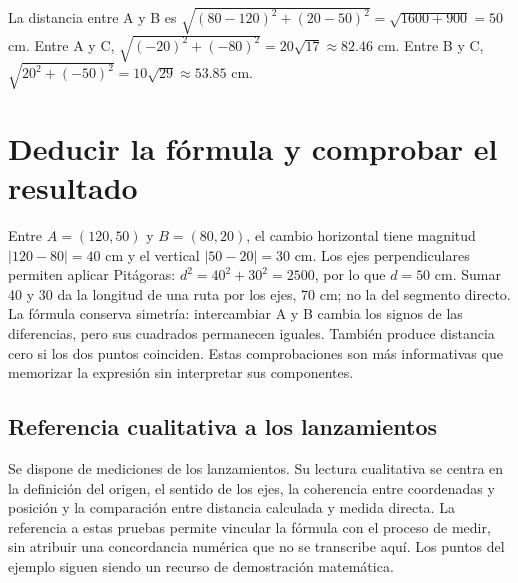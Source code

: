 \documentclass[spanish,letterpaper,oneside]{article}
\begin{document}
La distancia entre A y B es $\sqrt{(80-120)^2+(20-50)^2}=\sqrt{1600+900}=50$ cm. Entre A y C, $\sqrt{(-20)^2+(-80)^2}=20\sqrt{17}\approx82.46$ cm. Entre B y C, $\sqrt{20^2+(-50)^2}=10\sqrt{29}\approx53.85$ cm.
\begin{center}\end{center}
\section{Deducir la fórmula y comprobar el resultado}
Entre $A=(120,50)$ y $B=(80,20)$, el cambio horizontal tiene magnitud $|120-80|=40$ cm y el vertical $|50-20|=30$ cm. Los ejes perpendiculares permiten aplicar Pitágoras: $d^2=40^2+30^2=2500$, por lo que $d=50$ cm. Sumar 40 y 30 da la longitud de una ruta por los ejes, 70 cm; no la del segmento directo.
La fórmula conserva simetría: intercambiar A y B cambia los signos de las diferencias, pero sus cuadrados permanecen iguales. También produce distancia cero si los dos puntos coinciden. Estas comprobaciones son más informativas que memorizar la expresión sin interpretar sus componentes.


\subsection{Referencia cualitativa a los lanzamientos}
Se dispone de mediciones de los lanzamientos. Su lectura cualitativa se centra en la definición del origen, el sentido de los ejes, la coherencia entre coordenadas y posición y la comparación entre distancia calculada y medida directa. La referencia a estas pruebas permite vincular la fórmula con el proceso de medir, sin atribuir una concordancia numérica que no se transcribe aquí. Los puntos del ejemplo siguen siendo un recurso de demostración matemática.
\end{document}
